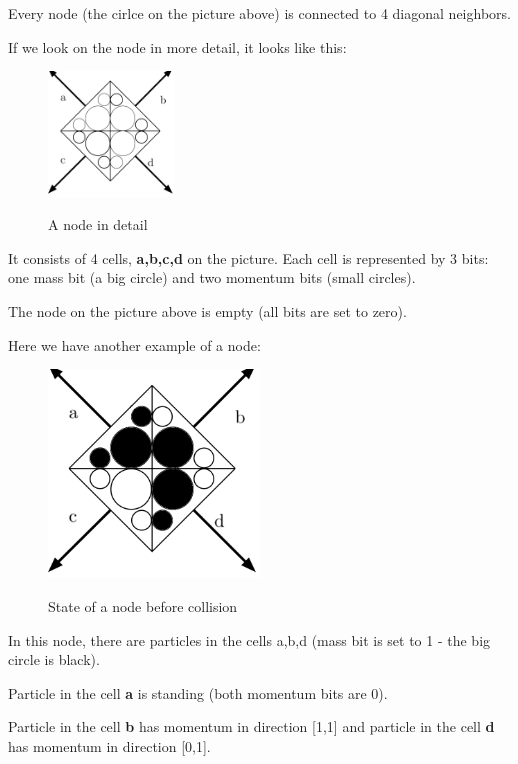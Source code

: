 Every node (the cirlce on the picture above) is connected to 4 diagonal neighbors.

If we look on the node in more detail, it looks like this:

\begin{figure}[htbp]
 \centering 
 \includegraphics[width=0.3\textwidth]{./img/node_empty}
 \label{empty}
 \caption{A node in detail}
\end{figure}

\newpage
It consists of 4 cells, \textbf{a,b,c,d} on the picture. Each cell is represented by 3 bits: one mass bit (a big circle) and two momentum bits (small circles).

The node on the picture above is empty (all bits are set to zero).

Here we have another example of a node:
\begin{figure}[htbp]
 \centering 
 \includegraphics[width=0.5\textwidth]{./img/node_1}
 \label{pre_collision}
 \caption{State of a node before collision}
\end{figure}

In this node, there are particles in the cells a,b,d (mass bit is set to 1 - the big circle is black).

Particle in the cell \textbf{a} is standing (both momentum bits are 0).

Particle in the cell \textbf{b} has momentum in direction [1,1] and particle in the cell \textbf{d} has momentum in direction [0,1].

